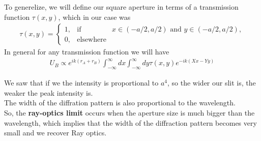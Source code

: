 To generelize, we will define our square aperture in terms of a transmission function $\tau(x,y)$, which in our case was
\begin{align*}
				\tau(x,y) = \left\{\begin{array}{rcl}
												1, &\text{if}& x \in (-a/2,a/2) \text{ and } y \in (-a/2,a/2), \\
												0, &\text{elsewhere}&  
				\end{array} \right.
\end{align*}
In general for any transmission function we will have
\begin{align*}
				U_B \propto e^{ik(r_A + r_B)} \int_{-\infty}^{\infty}dx \int_{-\infty}^{\infty}dy \tau(x,y) e^{-ik(Xx - Yy)}
\end{align*}


We saw that if we the intensity is proportional to $a^4$, so the wider our slit is, the weaker the peak intensity is.\\
The width of the diffration pattern is also proportional to the wavelength.\\


So, the \textbf{ray-optics limit} occurs when the aperture size is much bigger than the wavelength, which implies that the width of the diffraction pattern becomes very small and we recover Ray optics.
